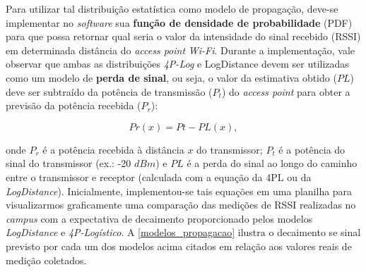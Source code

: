 \documentclass[
	12pt,				%
	twoside,			%
	a4paper,			%
	english,			%
	french,				%
	spanish,			%
	brazil				%
	]{abntex2}
\begin{document}
Para utilizar tal distribuição estatística como modelo de propagação,
deve-se implementar no \emph{software} sua \textbf{função de densidade
de probabilidade} (PDF) para que possa retornar qual seria o valor da
intensidade do sinal recebido (RSSI) em determinada distância do
\emph{access point} \emph{Wi-Fi}. Durante a implementação, vale observar
que ambas as distribuições \emph{4P-Log} e LogDistance devem ser
utilizadas como um modelo de \textbf{perda de sinal}, ou seja, o valor
da estimativa obtido (\(PL\)) deve ser subtraído da potência de
transmissão (\(P_{t}\)) do \emph{access point} para obter a previsão da
potência recebida (\(P_{r}\)):

\begin{equation}
    Pr(x) = Pt - PL(x),
\end{equation}

\noindent onde \(P_{r}\) é a potência recebida à distância \(x\) do
transmissor; \(P_{t}\) é a potência do sinal do transmissor (ex.: -20
\(dBm\)) e \(PL\) é a perda do sinal ao longo do caminho entre o
transmissor e receptor (calculada com a equação da 4PL ou da
\emph{LogDistance}). Inicialmente, implementou-se tais equações em uma
planilha para visualizarmos graficamente uma comparação das medições de
RSSI realizadas no \emph{campus} com a expectativa de decaimento
proporcionado pelos modelos \emph{LogDistance} e \emph{4P-Logístico}. A
\autoref{modelos_propagacao} ilustra o decaimento se sinal previsto por
cada um dos modelos acima citados em relação aos valores reais de
medição coletados.
\end{document}
